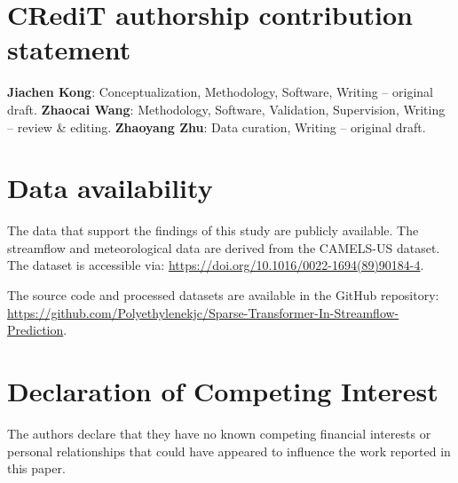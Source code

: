 \section*{CRediT authorship contribution statement}

\textbf{Jiachen Kong}: Conceptualization, Methodology, Software, Writing -- original draft.   \textbf{Zhaocai Wang}: Methodology, Software, Validation, Supervision, Writing -- review \& editing. \textbf{Zhaoyang Zhu}: Data curation, Writing -- original draft.

\section*{Data availability}

The data that support the findings of this study are publicly available. The streamflow and meteorological data are derived from the CAMELS-US dataset\cite{CAMELS}. The dataset is accessible via: \href{https://doi.org/10.1016/0022-1694(89)90184-4}{https://doi.org/10.1016/0022-1694(89)90184-4}. 

The source code and processed datasets are available in the GitHub repository: \href{https://github.com/Polyethylenekjc/Sparse-Transformer-In-Streamflow-Prediction}{https://github.com/Polyethylenekjc/Sparse-Transformer-In-Streamflow-Prediction}.

\section*{Declaration of Competing Interest}

The authors declare that they have no known competing financial interests or personal relationships that could have appeared to influence the work reported in this paper.


